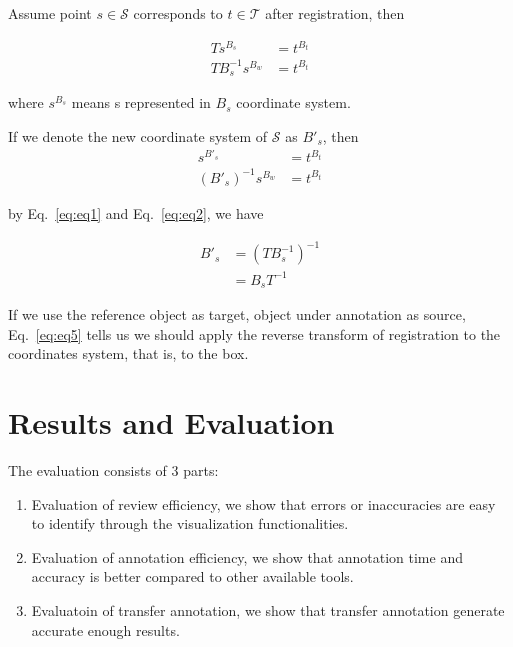 \documentclass[letterpaper, 10 pt, conference]{ieeeconf}  %
\begin{document}
Assume point $s \in \mathcal{S}$ corresponds to $t \in \mathcal{T}$ after registration, then


\begin{align}
T s^{B_s} &= t^{B_t}\\
T B_s^{-1}s^{B_w} &= t^{B_t} \label{eq:eq1}
\end{align}

where $s^{B_s}$ means s represented in $B_s$ coordinate system.

If we denote the new coordinate system of $\mathcal{S}$ as $B'_s$, then
\begin{align} 
s^{B'_s} &= t^{B_t}\\
(B'_s)^{-1}s^{B_w} &= t^{B_t} \label{eq:eq2}
\end{align}


by Eq.~\eqref{eq:eq1} and Eq.~\eqref{eq:eq2}, we have

\begin{align}
{B'_s} & = (T B_s^{-1})^{-1}\\
       & = B_s T^{-1} \label{eq:eq5}
\end{align}

If we use the reference object as target, object under annotation as source, Eq.~\eqref{eq:eq5} tells us we should apply the reverse transform of registration to the coordinates system, that is, to the box.



\section{Results and Evaluation}
\label {sec:results}

The evaluation consists of 3 parts:
\begin{enumerate}
	\item Evaluation of review efficiency, we show that errors or inaccuracies are easy to identify through the visualization functionalities.
	\item Evaluation of annotation efficiency, we show that annotation time and accuracy is better compared to other available tools.
	\item Evaluatoin of transfer annotation, we show that transfer annotation generate accurate enough results.
\end{enumerate}
\end{document}
